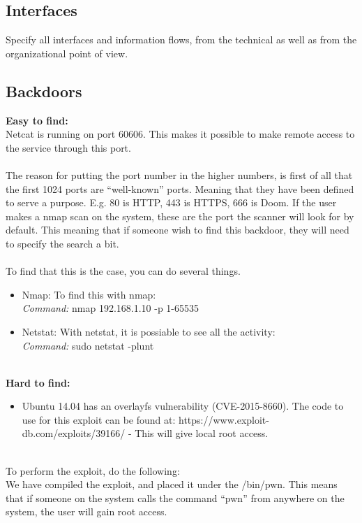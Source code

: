 \documentclass{article}
\begin{document}
\subsection{Interfaces}

Specify  all interfaces and  information flows, from the technical as well as from the
  organizational point of view.

\subsection{Backdoors}
\textbf{Easy to find:}\\ 
Netcat is running on port 60606. This makes it possible to make remote access to the service through this port.\\ \\
The reason for putting the port number in the higher numbers, is first of all that the first 1024 ports are “well-known” ports.  Meaning that they have been defined to serve a purpose. E.g. 80 is HTTP, 443 is HTTPS, 666 is Doom. If the user makes a nmap scan on the system, these are the port the scanner will look for by default. This meaning that if someone wish to find this backdoor, they will need to specify the search a bit.\\ \\
To find that this is the case, you can do several things.
\begin{itemize}
\item Nmap: To find this with nmap:\\
\textit{Command:} nmap 192.168.1.10 -p 1-65535
\item	Netstat: With netstat, it is possiable to see all the activity:\\
\textit{Command:} sudo netstat -plunt
\end{itemize} 
\ \\
\textbf{Hard to find:}
\begin{itemize}
\item Ubuntu 14.04 has an overlayfs vulnerability (CVE-2015-8660). The code to use for this exploit can be found at: https://www.exploit-db.com/exploits/39166/ - This will give local root access.
\end{itemize}
\ \\
To perform the exploit, do the following:\\
We have compiled the exploit, and placed it under the /bin/pwn. This means that if someone on the system calls the command “pwn” from anywhere on the system, the user will gain root access. \\ \\
\end{document}
